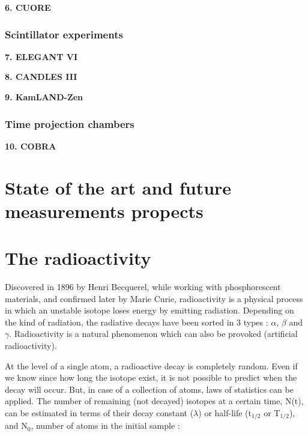 \documentclass[main.tex]{subfiles}
\begin{document}
\NI \textbf{6. CUORE}

\subsubsection{Scintillator experiments}

\NI \textbf{7. ELEGANT VI}

\bigskip

\NI \textbf{8. CANDLES III}

\bigskip

\NI \textbf{9. KamLAND-Zen}


\subsubsection{Time projection chambers}

\NI \textbf{10. COBRA}



\section{State of the art and future measurements propects}\label{sec:StatusDBD}


\newpage 



\bigskip



  

\section{The radioactivity}\label{sec:radioactivity}


\NI Discovered in 1896 by Henri Becquerel, while working with phosphorescent materials, and confirmed later by Marie Curie, radioactivity is a physical process in which an unstable isotope loses energy by emitting radiation. Depending on the kind of radiation, the radiative decays have been sorted in 3 types : $\alpha$, $\beta$ and $\gamma$. Radioactivity is a natural phenomenon which can also be provoked (artificial radioactivity).


\bigskip


\NI At the level of a single atom, a radioactive decay is completely random. Even if we know since how long the isotope exist, it is not possible to predict when the decay will occur. But, in case of a collection of atoms, laws of statistics can be applied. The number of remaining (not decayed) isotopes at a certain time, N(t), can be estimated in terms of their decay constant ($\lambda$) or half-life ($\text{t}_{\text{1/2}}$ or T$_{\text{1/2}}$), and N$_\text{0}$, number of atoms in the initial sample : 
\end{document}
